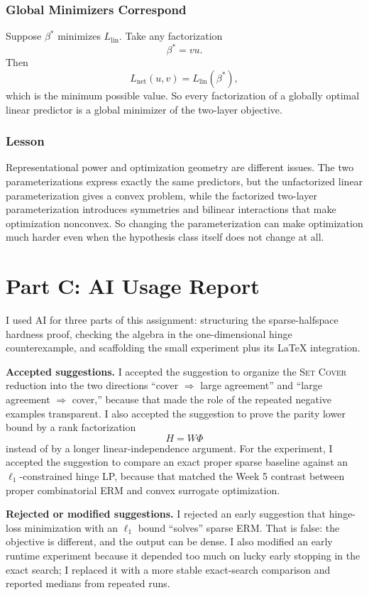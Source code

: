 \documentclass{article}
\begin{document}
\subsubsection{Global Minimizers Correspond}

Suppose $\beta^*$ minimizes $L_{\mathrm{lin}}$. Take any factorization
$$
\beta^*=vu.
$$
Then
$$
L_{\mathrm{net}}(u,v)
=
L_{\mathrm{lin}}(\beta^*),
$$
which is the minimum possible value. So every factorization of a globally optimal linear predictor is a global minimizer of the two-layer objective.

\subsubsection{Lesson}

Representational power and optimization geometry are different issues. The two parameterizations express exactly the same predictors, but the unfactorized linear parameterization gives a convex problem, while the factorized two-layer parameterization introduces symmetries and bilinear interactions that make optimization nonconvex. So changing the parameterization can make optimization much harder even when the hypothesis class itself does not change at all.

\newpage
\section{Part C: AI Usage Report}

I used AI for three parts of this assignment: structuring the sparse-halfspace hardness proof, checking the algebra in the one-dimensional hinge counterexample, and scaffolding the small experiment plus its LaTeX integration.

\textbf{Accepted suggestions.}
I accepted the suggestion to organize the \textsc{Set Cover} reduction into the two directions ``cover $\Rightarrow$ large agreement'' and ``large agreement $\Rightarrow$ cover,'' because that made the role of the repeated negative examples transparent. I also accepted the suggestion to prove the parity lower bound by a rank factorization
$$
H=W\Phi
$$
instead of by a longer linear-independence argument. For the experiment, I accepted the suggestion to compare an exact proper sparse baseline against an $\ell_1$-constrained hinge LP, because that matched the Week 5 contrast between proper combinatorial ERM and convex surrogate optimization.

\textbf{Rejected or modified suggestions.}
I rejected an early suggestion that hinge-loss minimization with an $\ell_1$ bound ``solves'' sparse ERM. That is false: the objective is different, and the output can be dense. I also modified an early runtime experiment because it depended too much on lucky early stopping in the exact search; I replaced it with a more stable exact-search comparison and reported medians from repeated runs.
\end{document}
